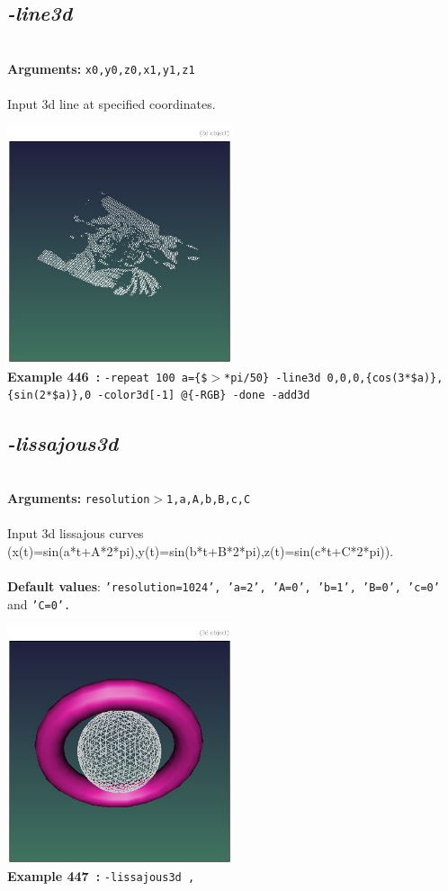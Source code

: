 \documentclass[a4paper,11pt,twoside]{book}
\begin{document}
\subsection{\emph{-line3d} }\vspace*{-0.5em}
~\\\textbf{Arguments: } 
{\small \texttt{x0,y0,z0,x1,y1,z1}}\\~\\
Input 3d line at specified coordinates.
\begin{center}\includegraphics[keepaspectratio=true,height=7cm,width=\textwidth]{img/gmic_def446.jpg}\\
{\footnotesize \textbf{Example 446~:} \texttt{-repeat 100 a=\{\$$>$*pi/50\} -line3d 0,0,0,\{cos(3*\$a)\},\{sin(2*\$a)\},0 -color3d[-1] @\{-RGB\} -done -add3d}}
\end{center}

\subsection{\emph{-lissajous3d} }\vspace*{-0.5em}
~\\\textbf{Arguments: } 
{\small \texttt{resolution$>$1,a,A,b,B,c,C}}\\~\\
Input 3d lissajous curves (x(t)=sin(a*t+A*2*pi),y(t)=sin(b*t+B*2*pi),z(t)=sin(c*t+C*2*pi)).
~\\~\\\textbf{Default values}: {\small \texttt{'resolution=1024', 'a=2', 'A=0', 'b=1', 'B=0', 'c=0'} and \texttt{'C=0'.}}
\begin{center}\includegraphics[keepaspectratio=true,height=7cm,width=\textwidth]{img/gmic_def447.jpg}\\
{\footnotesize \textbf{Example 447~:} \texttt{-lissajous3d ,}}
\end{center}
\end{document}
